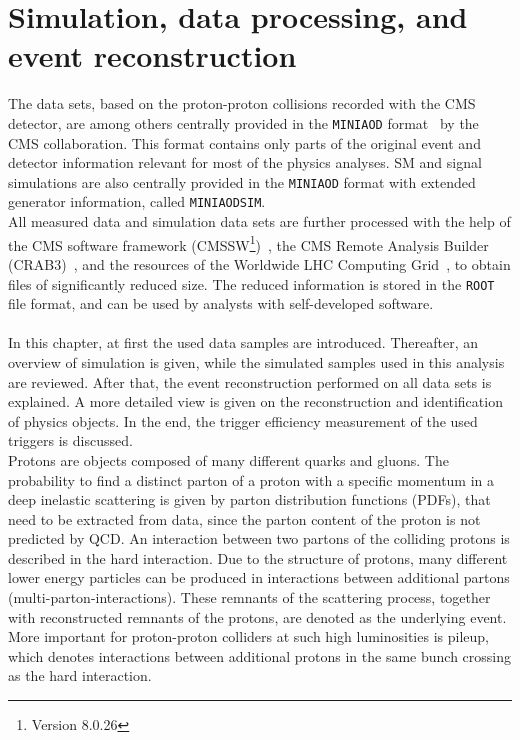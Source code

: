 \chapter{Simulation, data processing, and event reconstruction}\label{chap:reco}
\minitoc
The data sets, based on the proton-proton collisions recorded with the CMS detector, are among others centrally provided in the \texttt{MINIAOD} format~\cite{MiniAOD} by the CMS collaboration. This format contains only parts of the original event and detector information relevant for most of the physics analyses. SM and signal simulations are also centrally provided in the \texttt{MINIAOD} format with extended generator information, called \texttt{MINIAODSIM}.\\
All measured data and simulation data sets are further processed with the help of the CMS software framework (CMSSW\footnote{Version 8.0.26})~\cite{CMSSW}, the CMS Remote Analysis Builder (CRAB3)~\cite{CRAB}, and the resources of the Worldwide LHC Computing Grid~\cite{Grid}, to obtain files of significantly reduced size. The reduced information is stored in the \texttt{ROOT}~\cite{ROOT} file format, and can be used by analysts with self-developed software.\\
\\
In this chapter, at first the used data samples are introduced. Thereafter, an overview of simulation is given, while the simulated samples used in this analysis are reviewed. After that, the event reconstruction performed on all data sets is explained. A more detailed view is given on the reconstruction and identification of physics objects. In the end, the trigger efficiency measurement of the used triggers is discussed.\\

Protons are objects composed of many different quarks and gluons. The probability to find a distinct parton of a proton with a specific momentum in a deep inelastic scattering is given by parton distribution functions (PDFs)\cite{PDF}, that need to be extracted from data, since the parton content of the proton is not predicted by QCD.
An interaction between two partons of the colliding protons is described in the hard interaction. Due to the structure of protons, many different lower energy particles can be produced in interactions between additional partons (multi-parton-interactions). These remnants of the scattering process, together with reconstructed remnants of the protons, are denoted as the underlying event. More important for proton-proton colliders at such high luminosities is pileup, which denotes interactions between additional protons in the same bunch crossing as the hard interaction.

